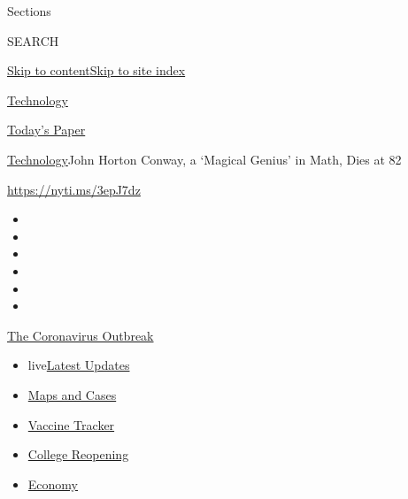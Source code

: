 Sections

SEARCH

\protect\hyperlink{site-content}{Skip to
content}\protect\hyperlink{site-index}{Skip to site index}

\href{https://www.nytimes.com/section/technology}{Technology}

\href{https://myaccount.nytimes.com/auth/login?response_type=cookie\&client_id=vi}{}

\href{https://www.nytimes.com/section/todayspaper}{Today's Paper}

\href{/section/technology}{Technology}\textbar{}John Horton Conway, a
`Magical Genius' in Math, Dies at 82

\url{https://nyti.ms/3epJ7dz}

\begin{itemize}
\item
\item
\item
\item
\item
\item
\end{itemize}

\href{https://www.nytimes.com/news-event/coronavirus?action=click\&pgtype=Article\&state=default\&region=TOP_BANNER\&context=storylines_menu}{The
Coronavirus Outbreak}

\begin{itemize}
\tightlist
\item
  live\href{https://www.nytimes.com/2020/08/03/world/coronavirus-covid-19.html?action=click\&pgtype=Article\&state=default\&region=TOP_BANNER\&context=storylines_menu}{Latest
  Updates}
\item
  \href{https://www.nytimes.com/interactive/2020/us/coronavirus-us-cases.html?action=click\&pgtype=Article\&state=default\&region=TOP_BANNER\&context=storylines_menu}{Maps
  and Cases}
\item
  \href{https://www.nytimes.com/interactive/2020/science/coronavirus-vaccine-tracker.html?action=click\&pgtype=Article\&state=default\&region=TOP_BANNER\&context=storylines_menu}{Vaccine
  Tracker}
\item
  \href{https://www.nytimes.com/2020/08/02/us/covid-college-reopening.html?action=click\&pgtype=Article\&state=default\&region=TOP_BANNER\&context=storylines_menu}{College
  Reopening}
\item
  \href{https://www.nytimes.com/live/2020/08/03/business/stock-market-today-coronavirus?action=click\&pgtype=Article\&state=default\&region=TOP_BANNER\&context=storylines_menu}{Economy}
\end{itemize}


